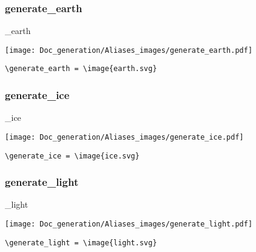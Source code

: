 \documentclass{article}
\begin{document}
\subsubsection{generate\_earth}
\begin{minipage}{0.45\linewidth}
\raggedright
\begin{spverbatim}
\generate_earth 
\end{spverbatim}
\end{minipage}
\begin{minipage}{0.45\linewidth}
\raggedleft
\texttt{[image: Doc\_generation/Aliases\_images/generate\_earth.pdf]}
\end{minipage}
\begin{center}
\begin{BVerbatim}
\generate_earth = \image{earth.svg}
\end{BVerbatim}
\end{center}

\subsubsection{generate\_ice}
\begin{minipage}{0.45\linewidth}
\raggedright
\begin{spverbatim}
\generate_ice 
\end{spverbatim}
\end{minipage}
\begin{minipage}{0.45\linewidth}
\raggedleft
\texttt{[image: Doc\_generation/Aliases\_images/generate\_ice.pdf]}
\end{minipage}
\begin{center}
\begin{BVerbatim}
\generate_ice = \image{ice.svg}
\end{BVerbatim}
\end{center}

\subsubsection{generate\_light}
\begin{minipage}{0.45\linewidth}
\raggedright
\begin{spverbatim}
\generate_light 
\end{spverbatim}
\end{minipage}
\begin{minipage}{0.45\linewidth}
\raggedleft
\texttt{[image: Doc\_generation/Aliases\_images/generate\_light.pdf]}
\end{minipage}
\begin{center}
\begin{BVerbatim}
\generate_light = \image{light.svg}
\end{BVerbatim}
\end{center}
\end{document}
